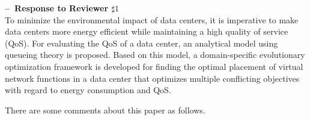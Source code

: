 
\noindent\textbf{--\ Response to Reviewer $\sharp1$}\\

\textsf{To minimize the environmental impact of data centers, it is imperative to make data centers more energy efficient while maintaining a high quality of service (QoS). For evaluating the QoS of a data center, an analytical model using queueing theory is proposed. Based on this model, a domain-specific evolutionary optimization framework is developed for finding the optimal placement of virtual network functions in a data center that optimizes multiple conflicting objectives with regard to energy consumption and QoS.}

\textsf{There are some comments about this paper as follows.}

